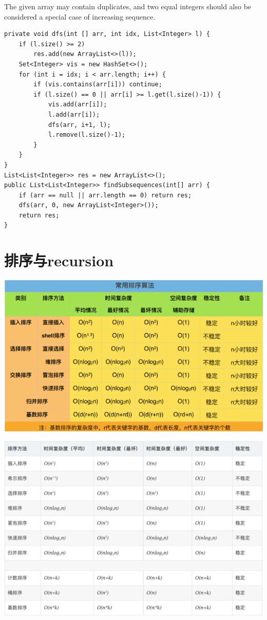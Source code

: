 \documentclass[9pt, b5paaper]{book}
\begin{document}
The given array may contain duplicates, and two equal integers should also be considered a special case of increasing sequence.
\begin{verbatim}
private void dfs(int [] arr, int idx, List<Integer> l) {
    if (l.size() >= 2)
        res.add(new ArrayList<>(l));
    Set<Integer> vis = new HashSet<>();
    for (int i = idx; i < arr.length; i++) {
        if (vis.contains(arr[i])) continue;
        if (l.size() == 0 || arr[i] >= l.get(l.size()-1)) {
            vis.add(arr[i]);
            l.add(arr[i]);
            dfs(arr, i+1, l);
            l.remove(l.size()-1);
        }
    }
}
List<List<Integer>> res = new ArrayList<>();
public List<List<Integer>> findSubsequences(int[] arr) {
    if (arr == null || arr.length == 0) return res;
    dfs(arr, 0, new ArrayList<Integer>());
    return res;
}
\end{verbatim}


\chapter{排序与recursion}
\label{sec-14}

\includegraphics[width=.9\linewidth]{./pic/sort.png}

\includegraphics[width=.9\linewidth]{./pic/sort2.png}
\end{document}
